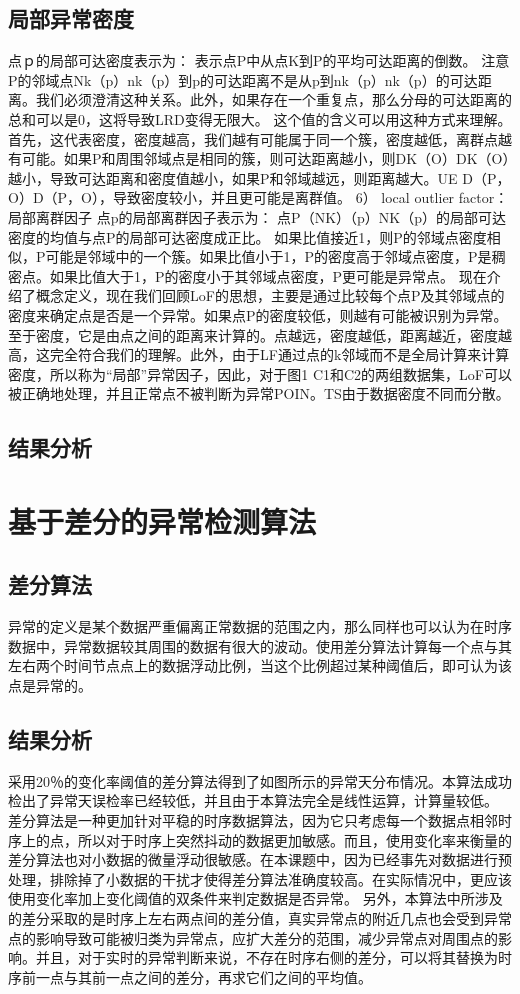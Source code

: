\documentclass[a4paper,AutoFakeBold,oneside,12pt]{book}
\begin{document}
{{\subsection{局部异常密度}
点ｐ的局部可达密度表示为：
	表示点P中从点K到P的平均可达距离的倒数。
	注意P的邻域点Nk（p）nk（p）到p的可达距离不是从p到nk（p）nk（p）的可达距离。我们必须澄清这种关系。此外，如果存在一个重复点，那么分母的可达距离的总和可以是0，这将导致LRD变得无限大。
	这个值的含义可以用这种方式来理解。首先，这代表密度，密度越高，我们越有可能属于同一个簇，密度越低，离群点越有可能。如果P和周围邻域点是相同的簇，则可达距离越小，则DK（O）DK（O）越小，导致可达距离和密度值越小，如果P和邻域越远，则距离越大。UE D（P，O）D（P，O），导致密度较小，并且更可能是离群值。
	6） local outlier factor：局部离群因子
	点p的局部离群因子表示为：
	点P（NK）（p）NK（p）的局部可达密度的均值与点P的局部可达密度成正比。
	如果比值接近1，则P的邻域点密度相似，P可能是邻域中的一个簇。如果比值小于1，P的密度高于邻域点密度，P是稠密点。如果比值大于1，P的密度小于其邻域点密度，P更可能是异常点。
	现在介绍了概念定义，现在我们回顾LoF的思想，主要是通过比较每个点P及其邻域点的密度来确定点是否是一个异常。如果点P的密度较低，则越有可能被识别为异常。至于密度，它是由点之间的距离来计算的。点越远，密度越低，距离越近，密度越高，这完全符合我们的理解。此外，由于LF通过点的k邻域而不是全局计算来计算密度，所以称为“局部”异常因子，因此，对于图1 C1和C2的两组数据集，LoF可以被正确地处理，并且正常点不被判断为异常POIN。TS由于数据密度不同而分散。
\subsection{结果分析}

\section{基于差分的异常检测算法}
\subsection{差分算法}
异常的定义是某个数据严重偏离正常数据的范围之内，那么同样也可以认为在时序数据中，异常数据较其周围的数据有很大的波动。使用差分算法计算每一个点与其左右两个时间节点点上的数据浮动比例，当这个比例超过某种阈值后，即可认为该点是异常的。
\subsection{结果分析}
采用20％的变化率阈值的差分算法得到了如图所示的异常天分布情况。本算法成功检出了异常天误检率已经较低，并且由于本算法完全是线性运算，计算量较低。
	差分算法是一种更加针对平稳的时序数据算法，因为它只考虑每一个数据点相邻时序上的点，所以对于时序上突然抖动的数据更加敏感。而且，使用变化率来衡量的差分算法也对小数据的微量浮动很敏感。在本课题中，因为已经事先对数据进行预处理，排除掉了小数据的干扰才使得差分算法准确度较高。在实际情况中，更应该使用变化率加上变化阈值的双条件来判定数据是否异常。
	另外，本算法中所涉及的差分采取的是时序上左右两点间的差分值，真实异常点的附近几点也会受到异常点的影响导致可能被归类为异常点，应扩大差分的范围，减少异常点对周围点的影响。并且，对于实时的异常判断来说，不存在时序右侧的差分，可以将其替换为时序前一点与其前一点之间的差分，再求它们之间的平均值。
}}
\end{document}
